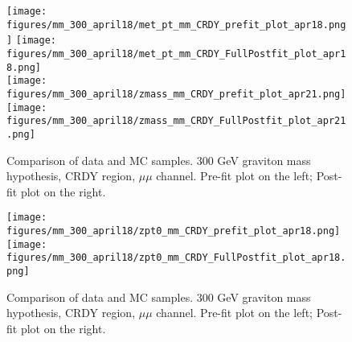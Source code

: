 \begin{figure}[H]
\begin{center}
\texttt{[image: figures/mm\_300\_april18/met\_pt\_mm\_CRDY\_prefit\_plot\_apr18.png]}
\texttt{[image: figures/mm\_300\_april18/met\_pt\_mm\_CRDY\_FullPostfit\_plot\_apr18.png]}\\
\texttt{[image: figures/mm\_300\_april18/zmass\_mm\_CRDY\_prefit\_plot\_apr21.png]}
\texttt{[image: figures/mm\_300\_april18/zmass\_mm\_CRDY\_FullPostfit\_plot\_apr21.png]}\\
\caption[Data-MC comparison in CRDY.]{Comparison of data and MC samples. 300 GeV graviton mass hypothesis, CRDY region, $\mu\mu$ channel. Pre-fit plot on the left; Post-fit plot on the right.}
\label{MCcomparisons_mm_low_CRDY_4}
\end{center}
\end{figure}

\begin{figure}[H]
\begin{center}
\texttt{[image: figures/mm\_300\_april18/zpt0\_mm\_CRDY\_prefit\_plot\_apr18.png]}
\texttt{[image: figures/mm\_300\_april18/zpt0\_mm\_CRDY\_FullPostfit\_plot\_apr18.png]}\\
\caption[Data-MC comparison in CRDY.]{Comparison of data and MC samples. 300 GeV graviton mass hypothesis, CRDY region, $\mu\mu$ channel. Pre-fit plot on the left; Post-fit plot on the right.}
\label{MCcomparisons_mm_low_CRDY_5}
\end{center}
\end{figure}




